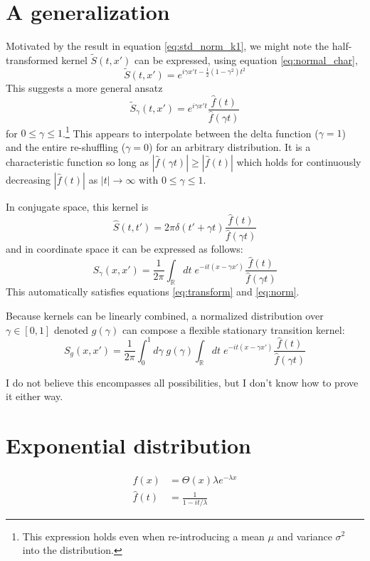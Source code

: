 \documentclass{article}
\newcommand{\intR}{\int_{\mathbb{R}}}
\begin{document}
\section{A generalization}
Motivated by the result in equation \ref{eq:std_norm_k1}, we might note the
half-transformed kernel $\tilde{S}(t, x')$ can be expressed, using equation \ref{eq:normal_char},
\begin{equation}
	\tilde{S}(t, x') = e^{i\gamma x' t - \frac{1}{2}(1 - \gamma^2)t^2}
\end{equation}
This suggests a more general ansatz
\begin{equation}
	\tilde{S}_\gamma (t, x') = e^{i\gamma x' t} \frac{\hat{f}(t)}{\hat{f}(\gamma t)}
\end{equation}
for $0 \leq \gamma \leq 1$.\footnote{This expression holds even when re-introducing a mean $\mu$ and variance $\sigma^2$ into the distribution.} This appears to interpolate between the delta
function ($\gamma = 1$) and the entire re-shuffling ($\gamma = 0$) for an
arbitrary distribution. It is a characteristic function so long as
$|\hat{f}(\gamma t)| \geq |\hat{f}(t)|$ which holds for continuously decreasing
$|\hat{f}(t)|$ as $|t| \rightarrow \infty$ with $0 \leq \gamma \leq 1$.

In conjugate space, this kernel is
\begin{equation}
	\hat{S}(t, t') = 2\pi \delta(t' + \gamma t) \frac{\hat{f}(t)}{\hat{f}(\gamma t)}
\end{equation}
and in coordinate space it can be expressed as follows:
\begin{equation}
	S_\gamma (x, x') = \frac{1}{2\pi} \intR dt\; e^{-it(x - \gamma x')} \frac{\hat{f}(t)}{\hat{f}(\gamma t)}
	\label{eq:spread_kernel}
\end{equation}
This automatically satisfies equations \ref{eq:transform} and \ref{eq:norm}.

Because kernels can be linearly combined, a normalized distribution over $\gamma \in [0,
		1]$ denoted $g(\gamma)$ can compose a flexible stationary transition kernel:
\begin{equation}
	S_g(x, x') = \frac{1}{2\pi} \int_0^1 d\gamma\; g(\gamma) \intR dt\; e^{-it(x-\gamma x')} \frac{\hat{f}(t)}{\hat{f}(\gamma t)}
\end{equation}

I do not believe this encompasses all possibilities, but I don't know how to prove it either way.

\section{Exponential distribution}
\begin{align}
	f(x)      & = \Theta(x) \lambda e^{-\lambda x} \\
	\hat f(t) & = \frac{1}{1 - it/\lambda}
\end{align}
\end{document}
